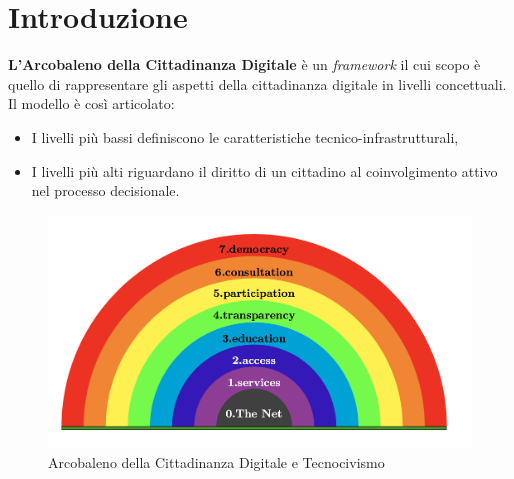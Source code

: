 \chapter{Introduzione}
\textbf{L'Arcobaleno della Cittadinanza Digitale} è un \emph{framework} il cui scopo è quello di rappresentare gli aspetti della cittadinanza digitale in livelli concettuali. Il modello è così articolato:
\begin{itemize}
    \item I livelli più bassi definiscono le caratteristiche tecnico-infrastrutturali,
    \item I livelli più alti riguardano il diritto di un cittadino al coinvolgimento attivo nel processo decisionale.
\end{itemize}
\begin{figure}[h!]
    \centering
    \includegraphics[scale=0.5]{img/rainbow.png}
    \caption{Arcobaleno della Cittadinanza Digitale e Tecnocivismo}
    \label{fig:rainbow}
\end{figure}

